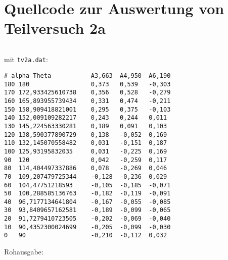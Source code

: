 \section{\gnuplot{} Quellcode zur Auswertung von Teilversuch 2a}
    \label{appdx:tv2a}
    {  
        \renewcommand{\fcolorbox}[4][]{#4}
        \inputminted[linenos,breaklines,autogobble,frame=leftline,framesep=10pt]{gnuplot}{plots/tv2a.gp}
    }
    mit \texttt{tv2a.dat}:
    \begin{verbatim}
# alpha Theta           A3,663  A4,950  A6,190
180 180                 0,373   0,539   -0,303
170 172,933425610738    0,356   0,528   -0,279
160 165,893955739434    0,331   0,474   -0,211
150 158,909418821001    0,295   0,375   -0,103
140 152,009109282217    0,243   0,244   0,011
130 145,224563330281    0,189   0,091   0,103
120 138,590377890729    0,138   -0,052  0,169
110 132,145070558482    0,031   -0,151  0,187
100 125,93195832035     0,031   -0,225  0,169
90  120                 0,042   -0,259  0,117
80  114,404497337886    0,078   -0,269  0,046
70  109,207479725344    -0,128  -0,236  0,029
60  104,47751218593     -0,105  -0,185  -0,071
50  100,288585136763    -0,182  -0,119  -0,091
40  96,7177134641804    -0,167  -0,055  -0,085
30  93,8409657162581    -0,189  -0,099  -0,065
20  91,7279410723505    -0,202  -0,069  -0,040
10  90,4352300024699    -0,205  -0,099  -0,030
0   90                  -0,210  -0,112  0,032
        \end{verbatim}
    Rohausgabe:
    \inputminted[linenos,breaklines,autogobble,frame=leftline,framesep=10pt]{text}{plots/tv2a.gp.out}